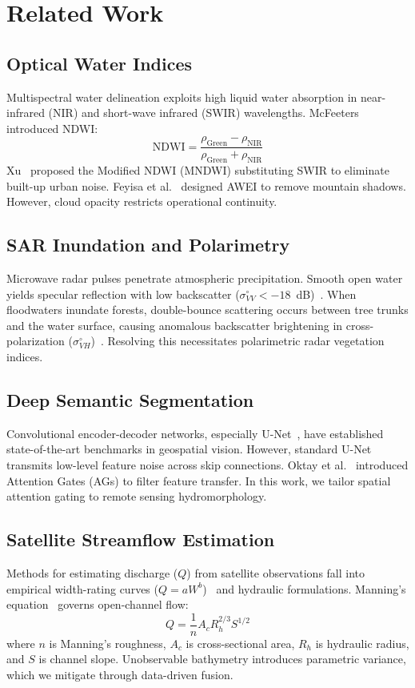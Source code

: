 \documentclass[conference]{IEEEtran}
\begin{document}
\section{Related Work}
\subsection{Optical Water Indices}
Multispectral water delineation exploits high liquid water absorption in near-infrared (NIR) and short-wave infrared (SWIR) wavelengths. McFeeters~\cite{mcfeeters1996} introduced NDWI:
\begin{equation}
\text{NDWI} = \frac{\rho_{\text{Green}} - \rho_{\text{NIR}}}{\rho_{\text{Green}} + \rho_{\text{NIR}}}
\end{equation}
Xu~\cite{xu2006} proposed the Modified NDWI (MNDWI) substituting SWIR to eliminate built-up urban noise. Feyisa et al.~\cite{feyisa2014} designed AWEI to remove mountain shadows. However, cloud opacity restricts operational continuity.

\subsection{SAR Inundation and Polarimetry}
Microwave radar pulses penetrate atmospheric precipitation. Smooth open water yields specular reflection with low backscatter ($\sigma^\circ_{VV} < -18$~dB)~\cite{matgen2020}. When floodwaters inundate forests, double-bounce scattering occurs between tree trunks and the water surface, causing anomalous backscatter brightening in cross-polarization ($\sigma^\circ_{VH}$)~\cite{cloude1996}. Resolving this necessitates polarimetric radar vegetation indices.

\subsection{Deep Semantic Segmentation}
Convolutional encoder-decoder networks, especially U-Net~\cite{ronneberger2015}, have established state-of-the-art benchmarks in geospatial vision. However, standard U-Net transmits low-level feature noise across skip connections. Oktay et al.~\cite{oktay2018} introduced Attention Gates (AGs) to filter feature transfer. In this work, we tailor spatial attention gating to remote sensing hydromorphology.

\subsection{Satellite Streamflow Estimation}
Methods for estimating discharge ($Q$) from satellite observations fall into empirical width-rating curves ($Q = a W^b$)~\cite{smith1997} and hydraulic formulations. Manning's equation~\cite{manning1891} governs open-channel flow:
\begin{equation}
Q = \frac{1}{n} A_c R_h^{2/3} S^{1/2}
\end{equation}
where $n$ is Manning's roughness, $A_c$ is cross-sectional area, $R_h$ is hydraulic radius, and $S$ is channel slope. Unobservable bathymetry introduces parametric variance, which we mitigate through data-driven fusion.
\end{document}
